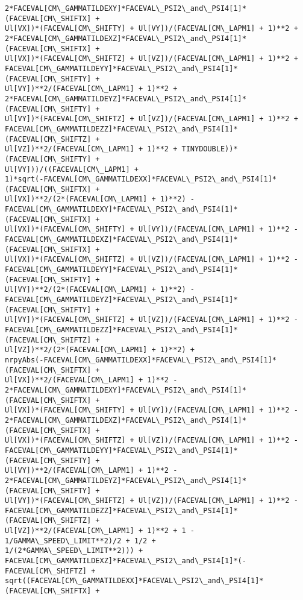 \documentclass[landscape,letterpaper,10pt,english]{article}
\begin{document}
\begin{Verbatim}[commandchars=\\\{\}]
2*FACEVAL[CM\_GAMMATILDEXY]*FACEVAL\_PSI2\_and\_PSI4[1]*(FACEVAL[CM\_SHIFTX] +
Ul[VX])*(FACEVAL[CM\_SHIFTY] + Ul[VY])/(FACEVAL[CM\_LAPM1] + 1)**2 +
2*FACEVAL[CM\_GAMMATILDEXZ]*FACEVAL\_PSI2\_and\_PSI4[1]*(FACEVAL[CM\_SHIFTX] +
Ul[VX])*(FACEVAL[CM\_SHIFTZ] + Ul[VZ])/(FACEVAL[CM\_LAPM1] + 1)**2 +
FACEVAL[CM\_GAMMATILDEYY]*FACEVAL\_PSI2\_and\_PSI4[1]*(FACEVAL[CM\_SHIFTY] +
Ul[VY])**2/(FACEVAL[CM\_LAPM1] + 1)**2 +
2*FACEVAL[CM\_GAMMATILDEYZ]*FACEVAL\_PSI2\_and\_PSI4[1]*(FACEVAL[CM\_SHIFTY] +
Ul[VY])*(FACEVAL[CM\_SHIFTZ] + Ul[VZ])/(FACEVAL[CM\_LAPM1] + 1)**2 +
FACEVAL[CM\_GAMMATILDEZZ]*FACEVAL\_PSI2\_and\_PSI4[1]*(FACEVAL[CM\_SHIFTZ] +
Ul[VZ])**2/(FACEVAL[CM\_LAPM1] + 1)**2 + TINYDOUBLE))*(FACEVAL[CM\_SHIFTY] +
Ul[VY]))/((FACEVAL[CM\_LAPM1] +
1)*sqrt(-FACEVAL[CM\_GAMMATILDEXX]*FACEVAL\_PSI2\_and\_PSI4[1]*(FACEVAL[CM\_SHIFTX] +
Ul[VX])**2/(2*(FACEVAL[CM\_LAPM1] + 1)**2) -
FACEVAL[CM\_GAMMATILDEXY]*FACEVAL\_PSI2\_and\_PSI4[1]*(FACEVAL[CM\_SHIFTX] +
Ul[VX])*(FACEVAL[CM\_SHIFTY] + Ul[VY])/(FACEVAL[CM\_LAPM1] + 1)**2 -
FACEVAL[CM\_GAMMATILDEXZ]*FACEVAL\_PSI2\_and\_PSI4[1]*(FACEVAL[CM\_SHIFTX] +
Ul[VX])*(FACEVAL[CM\_SHIFTZ] + Ul[VZ])/(FACEVAL[CM\_LAPM1] + 1)**2 -
FACEVAL[CM\_GAMMATILDEYY]*FACEVAL\_PSI2\_and\_PSI4[1]*(FACEVAL[CM\_SHIFTY] +
Ul[VY])**2/(2*(FACEVAL[CM\_LAPM1] + 1)**2) -
FACEVAL[CM\_GAMMATILDEYZ]*FACEVAL\_PSI2\_and\_PSI4[1]*(FACEVAL[CM\_SHIFTY] +
Ul[VY])*(FACEVAL[CM\_SHIFTZ] + Ul[VZ])/(FACEVAL[CM\_LAPM1] + 1)**2 -
FACEVAL[CM\_GAMMATILDEZZ]*FACEVAL\_PSI2\_and\_PSI4[1]*(FACEVAL[CM\_SHIFTZ] +
Ul[VZ])**2/(2*(FACEVAL[CM\_LAPM1] + 1)**2) +
nrpyAbs(-FACEVAL[CM\_GAMMATILDEXX]*FACEVAL\_PSI2\_and\_PSI4[1]*(FACEVAL[CM\_SHIFTX] +
Ul[VX])**2/(FACEVAL[CM\_LAPM1] + 1)**2 -
2*FACEVAL[CM\_GAMMATILDEXY]*FACEVAL\_PSI2\_and\_PSI4[1]*(FACEVAL[CM\_SHIFTX] +
Ul[VX])*(FACEVAL[CM\_SHIFTY] + Ul[VY])/(FACEVAL[CM\_LAPM1] + 1)**2 -
2*FACEVAL[CM\_GAMMATILDEXZ]*FACEVAL\_PSI2\_and\_PSI4[1]*(FACEVAL[CM\_SHIFTX] +
Ul[VX])*(FACEVAL[CM\_SHIFTZ] + Ul[VZ])/(FACEVAL[CM\_LAPM1] + 1)**2 -
FACEVAL[CM\_GAMMATILDEYY]*FACEVAL\_PSI2\_and\_PSI4[1]*(FACEVAL[CM\_SHIFTY] +
Ul[VY])**2/(FACEVAL[CM\_LAPM1] + 1)**2 -
2*FACEVAL[CM\_GAMMATILDEYZ]*FACEVAL\_PSI2\_and\_PSI4[1]*(FACEVAL[CM\_SHIFTY] +
Ul[VY])*(FACEVAL[CM\_SHIFTZ] + Ul[VZ])/(FACEVAL[CM\_LAPM1] + 1)**2 -
FACEVAL[CM\_GAMMATILDEZZ]*FACEVAL\_PSI2\_and\_PSI4[1]*(FACEVAL[CM\_SHIFTZ] +
Ul[VZ])**2/(FACEVAL[CM\_LAPM1] + 1)**2 + 1 - 1/GAMMA\_SPEED\_LIMIT**2)/2 + 1/2 +
1/(2*GAMMA\_SPEED\_LIMIT**2))) +
FACEVAL[CM\_GAMMATILDEXZ]*FACEVAL\_PSI2\_and\_PSI4[1]*(-FACEVAL[CM\_SHIFTZ] +
sqrt((FACEVAL[CM\_GAMMATILDEXX]*FACEVAL\_PSI2\_and\_PSI4[1]*(FACEVAL[CM\_SHIFTX] +

\end{Verbatim}
\end{document}
